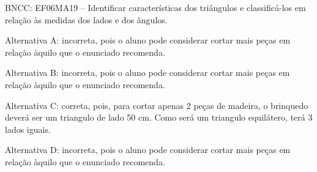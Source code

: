 \begin{enumerate}
BNCC: EF06MA19 -- Identificar características dos triângulos e
classificá-los em relação às medidas dos lados e dos ângulos.

Alternativa A: incorreta, pois o aluno pode considerar cortar mais peças
em relação àquilo que o enunciado recomenda.

Alternativa B: incorreta, pois o aluno pode considerar cortar mais peças
em relação àquilo que o enunciado recomenda.

Alternativa C: correta, pois, para cortar apenas 2 peças de madeira, o
brinquedo deverá ser um triangulo de lado 50 cm. Como será um triangulo
equilátero, terá 3 lados iguais.

Alternativa D: incorreta, pois o aluno pode considerar cortar mais peças
em relação àquilo que o enunciado recomenda.

	\end{enumerate}


